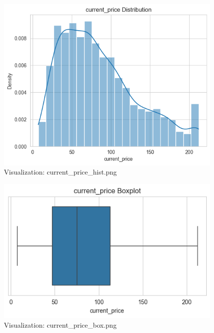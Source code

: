 \documentclass{article}%
\begin{document}
\vspace{10pt}%
\\%
\begin{minipage}[c]{0.48\textwidth}%


\begin{figure}[H]%
\centering%
\includegraphics[width=\linewidth]{output/plots/current_price_hist.png}%
\caption{Visualization: current\_price\_hist.png}%
\end{figure}

%
\end{minipage}%
\begin{minipage}[c]{0.48\textwidth}%


\begin{figure}[H]%
\centering%
\includegraphics[width=\linewidth]{output/plots/current_price_box.png}%
\caption{Visualization: current\_price\_box.png}%
\end{figure}

%
\end{minipage}%
\end{document}
